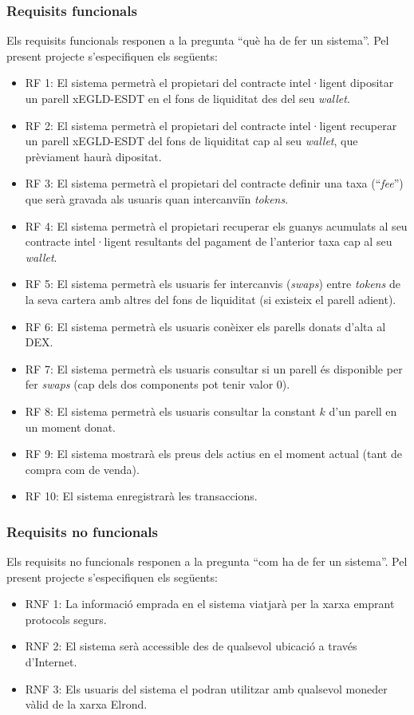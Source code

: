 \documentclass[11pt,a4paper]{article}
\begin{document}
\subsubsection{Requisits funcionals}\label{subsub:rfun}
Els requisits funcionals responen a la pregunta ``què ha de fer un sistema''. Pel present projecte s'especifiquen els següents:
\begin{itemize}
\item RF 1: El sistema permetrà el propietari del contracte intel·ligent dipositar un parell xEGLD-ESDT en el fons de liquiditat des del seu \textit{wallet}.
\item RF 2: El sistema permetrà el propietari del contracte intel·ligent recuperar un parell xEGLD-ESDT del fons de liquiditat cap al seu \textit{wallet}, que prèviament haurà dipositat.
\item RF 3: El sistema permetrà el propietari del contracte definir una taxa (``\textit{fee}'') que serà gravada als usuaris quan intercanviïn \textit{tokens}.
\item RF 4: El sistema permetrà el propietari recuperar els guanys acumulats al seu contracte intel·ligent resultants del pagament de l'anterior taxa cap al seu \textit{wallet}.
\item RF 5: El sistema permetrà els usuaris fer intercanvis (\textit{swaps}) entre \textit{tokens} de la seva cartera amb altres del fons de liquiditat (si existeix el parell adient).
\item RF 6: El sistema permetrà els usuaris conèixer els parells donats d'alta al DEX.
\item RF 7: El sistema permetrà els usuaris consultar si un parell és disponible per fer \textit{swaps} (cap dels dos components pot tenir valor 0).
\item RF 8: El sistema permetrà els usuaris consultar la constant \(k\) d'un parell en un moment donat.
\item RF 9: El sistema mostrarà els preus dels actius en el moment actual (tant de compra com de venda).
\item RF 10: El sistema enregistrarà les transaccions.
\end{itemize}

\subsubsection{Requisits no funcionals}\label{subsub:rnofun}
Els requisits no funcionals responen a la pregunta ``com ha de fer un sistema''. Pel present projecte s'especifiquen els següents:
\begin{itemize}
\item RNF 1: La informació emprada en el sistema viatjarà per la xarxa emprant protocols segurs.
\item RNF 2: El sistema serà accessible des de qualsevol ubicació a través d'Internet.
\item RNF 3: Els usuaris del sistema el podran utilitzar amb qualsevol moneder vàlid de la xarxa Elrond.
\end{itemize}
\end{document}
